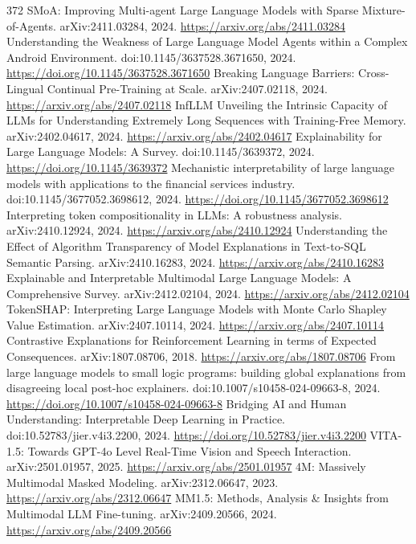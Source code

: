 \documentclass[11pt]{article}
\begin{document}
\begin{thebibliography}{372}
 SMoA: Improving Multi-agent Large Language Models with Sparse Mixture-of-Agents. arXiv:2411.03284, 2024. \url{https://arxiv.org/abs/2411.03284}
 Understanding the Weakness of Large Language Model Agents within a Complex Android Environment. doi:10.1145/3637528.3671650, 2024. \url{https://doi.org/10.1145/3637528.3671650}
 Breaking Language Barriers: Cross-Lingual Continual Pre-Training at Scale. arXiv:2407.02118, 2024. \url{https://arxiv.org/abs/2407.02118}
 InfLLM Unveiling the Intrinsic Capacity of LLMs for Understanding Extremely Long Sequences with Training-Free Memory. arXiv:2402.04617, 2024. \url{https://arxiv.org/abs/2402.04617}
 Explainability for Large Language Models: A Survey. doi:10.1145/3639372, 2024. \url{https://doi.org/10.1145/3639372}
 Mechanistic interpretability of large language models with applications to the financial services industry. doi:10.1145/3677052.3698612, 2024. \url{https://doi.org/10.1145/3677052.3698612}
 Interpreting token compositionality in LLMs: A robustness analysis. arXiv:2410.12924, 2024. \url{https://arxiv.org/abs/2410.12924}
 Understanding the Effect of Algorithm Transparency of Model Explanations in Text-to-SQL Semantic Parsing. arXiv:2410.16283, 2024. \url{https://arxiv.org/abs/2410.16283}
 Explainable and Interpretable Multimodal Large Language Models: A Comprehensive Survey. arXiv:2412.02104, 2024. \url{https://arxiv.org/abs/2412.02104}
 TokenSHAP: Interpreting Large Language Models with Monte Carlo Shapley Value Estimation. arXiv:2407.10114, 2024. \url{https://arxiv.org/abs/2407.10114}
 Contrastive Explanations for Reinforcement Learning in terms of Expected Consequences. arXiv:1807.08706, 2018. \url{https://arxiv.org/abs/1807.08706}
 From large language models to small logic programs: building global explanations from disagreeing local post-hoc explainers. doi:10.1007/s10458-024-09663-8, 2024. \url{https://doi.org/10.1007/s10458-024-09663-8}
 Bridging AI and Human Understanding: Interpretable Deep Learning in Practice. doi:10.52783/jier.v4i3.2200, 2024. \url{https://doi.org/10.52783/jier.v4i3.2200}
 VITA-1.5: Towards GPT-4o Level Real-Time Vision and Speech Interaction. arXiv:2501.01957, 2025. \url{https://arxiv.org/abs/2501.01957}
 4M: Massively Multimodal Masked Modeling. arXiv:2312.06647, 2023. \url{https://arxiv.org/abs/2312.06647}
 MM1.5: Methods, Analysis \& Insights from Multimodal LLM Fine-tuning. arXiv:2409.20566, 2024. \url{https://arxiv.org/abs/2409.20566}

\end{thebibliography}
\end{document}
